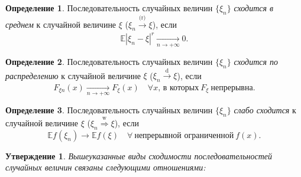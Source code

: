 \documentclass[oneside,final,14pt]{extreport}
\theoremstyle{plain}
\newtheorem*{thm*}{Утверждение}
\theoremstyle{definition}
\newtheorem*{defn}{Определение}
\theoremstyle{named}
\begin{document}
\begin{defn}
    Последовательность случайных величин $\{\xi_n\}$ {\it сходится в среднем} к случайной величине $\xi$ ($\xi_n \xrightarrow[]{\text{(r)}} \xi$), если
    \begin{equation*}
        \mathbb{E}\left|\xi_{n}-\xi\right|^{r} \xrightarrow[n \to +\infty]{} 0.
    \end{equation*}
\end{defn}

\begin{defn}
    Последовательность случайных величин $\{\xi_n\}$ {\it сходится по распределению} к случайной величине $\xi$ ($\xi_n \xrightarrow[]{\text{d}} \xi$), если
    \begin{equation*}
        F_{\xi n}(x) \xrightarrow[n \to +\infty]{} F_{\xi}(x) \quad \forall x, \, \text{в которых}~ F_{\xi} ~\text{непрерывна}.
    \end{equation*}
\end{defn}

\begin{defn}
    Последовательность случайных величин $\{\xi_n\}$ {\it слабо сходится} к случайной величине $\xi$ ($\xi_n \stackrel{\text{w}}{\Rightarrow} \xi$), если
    \begin{equation*}
        \mathbb{E} f\left(\xi_{n}\right) \rightarrow \mathbb{E} f(\xi) \quad \forall~ \text{непрерывной ограниченной}~ f(x).
    \end{equation*}
\end{defn}
\begin{thm*}
    Вышеуказанные виды сходимости последовательностей случайных величин связаны следующими отношениями:
    
    {%
   }
\end{thm*}
\end{document}
